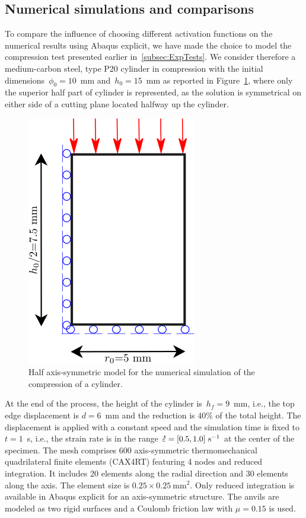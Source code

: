 \documentclass[algorithms,article,submit,pdftex,oneauthors]{Definitions/mdpi}
\makeatletter
\DeclareRobustCommand{\mdot}[1]{\accentset{\mbox{\bfseries .}}{#1}}
\DeclareRobustCommand{\ie}{i.e.,\@\xspace}
\DeclareRobustCommand{\ps}{\text{s}^{-1}}
\makeatother
\begin{document}
\subsection{Numerical simulations and comparisons}\label{subsec:Num-sim}

\textcolor{greencolor}{To compare the influence of choosing different activation functions on the numerical results using Abaqus explicit, we have made the choice to model the compression test presented earlier in~\ref{subsec:ExpTests}.
We consider therefore a medium-carbon steel, type P20 cylinder in compression with the initial dimensions~$\phi_{0}=10$~mm and~$h_{0}=15$~mm} as reported in Figure~\ref{fig:Num-model}, where only the superior half part of cylinder is represented, as the solution is symmetrical on either side of a cutting plane located halfway up the cylinder.
\begin{figure}[h!]
\centering
\includegraphics[width=0.25\columnwidth]{Figures/CyCompression}
\caption{Half axis-symmetric model for the numerical simulation of the compression of a cylinder.}
\label{fig:Num-model}
\end{figure}
\textcolor{greencolor}{At the end of the process, the height of the cylinder is~$h_f=9$~mm, \ie the top edge displacement is $d=6$~mm and the reduction is $40\%$ of the total height.}
The displacement is applied with a constant speed and the simulation time is fixed to $t=1$~s, \ie the strain rate is in the \textcolor{greencolor}{range $\mdot{\varepsilon}=[0.5,1.0]~\ps$} at the center of the specimen.
\textcolor{greencolor}{The mesh comprises 600 axis-symmetric thermomechanical quadrilateral finite elements (CAX4RT) featuring 4 nodes and reduced integration.
It includes 20 elements along the radial direction and 30 elements along the axis.}
The element size is $0.25\times0.25~\text{mm}^2$.
Only reduced integration is available in Abaqus explicit for an axis-symmetric structure.
\textcolor{greencolor}{The anvils are modeled as two rigid surfaces and a Coulomb friction law with $\mu=0.15$ is used.}
\end{document}
